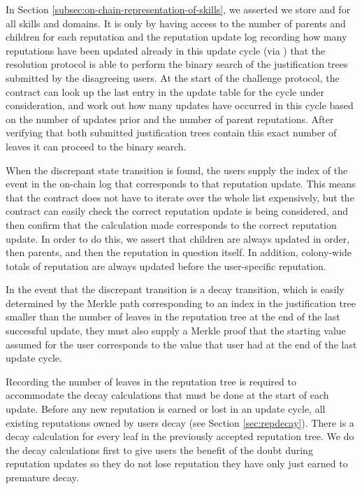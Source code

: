 In Section \ref{subsec:on-chain-representation-of-skills}, we asserted we store  and  for all skills and domains. It is only by having access to the number of parents and children for each reputation and the reputation update log recording how many reputations have been updated already in this update cycle (via ) that the resolution protocol is able to perform the binary search of the justification trees submitted by the disagreeing users. At the start of the challenge protocol, the contract can look up the last entry in the update table for the cycle under consideration, and work out how many updates have occurred in this cycle based on the number of updates prior and the number of parent reputations. After verifying that both submitted justification trees contain this exact number of leaves it can proceed to the binary search.

When the discrepant state transition is found, the users supply the index of the event in the on-chain log that corresponds to that reputation update.  This means that the contract does not have to iterate over the whole list expensively, but the contract can easily check the correct reputation update is being considered, and then confirm that the calculation made corresponds to the correct reputation update. In order to do this, we assert that children are always updated in order, then parents, and then the reputation in question itself. In addition, colony-wide totals of reputation are always updated before the user-specific reputation.

In the event that the discrepant transition is a decay transition, which is easily determined by the Merkle path corresponding to an index in the justification tree smaller than the number of leaves in the reputation tree at the end of the last successful update, they must also supply a Merkle proof that the starting value assumed for the user corresponds to the value that user had at the end of the last update cycle.

Recording the number of leaves in the reputation tree is required %
to accommodate the decay calculations that must be done at the start of each update. Before any new reputation is earned or lost in an update cycle, all existing reputations owned by users decay (see Section \ref{sec:repdecay}). There is a decay calculation for every leaf in the previously accepted reputation tree. We do the decay calculations first to give users the benefit of the doubt during reputation updates so they do not lose reputation they have only just earned to premature decay.

